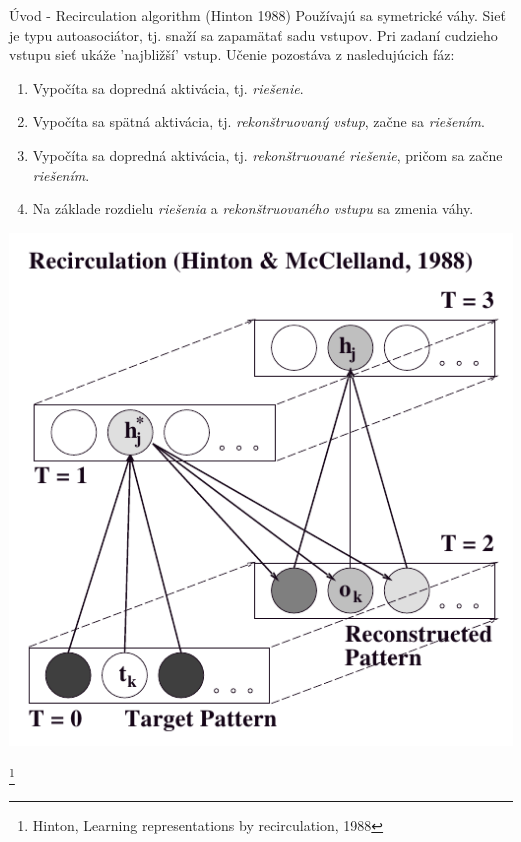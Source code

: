\documentclass[xcolor=dvipsnames]{beamer}
\begin{document}
\begin{frame}{Úvod - Recirculation algorithm (Hinton 1988)}
  Používajú sa symetrické váhy. Sieť je typu autoasociátor, tj. snaží sa zapamätať sadu vstupov. Pri zadaní cudzieho vstupu sieť ukáže 'najbližší' vstup. Učenie pozostáva z nasledujúcich fáz: 
  \begin{enumerate}
    \item Vypočíta sa dopredná aktivácia, tj. \emph{riešenie}. 
    \item Vypočíta sa spätná aktivácia, tj. \emph{rekonštruovaný vstup}, začne sa \emph{riešením}. 
    \item Vypočíta sa dopredná aktivácia, tj. \emph{rekonštruované riešenie}, pričom sa začne \emph{riešením}.
    \item Na základe rozdielu \emph{riešenia} a \emph{rekonštruovaného vstupu} sa zmenia váhy. 
  \end{enumerate}
  \begin{center}
    \includegraphics[scale=0.2]{img/recirculation.png}
  \end{center}  
    \footnote{Hinton, Learning representations by recirculation, 1988}
\end{frame}
\end{document}
